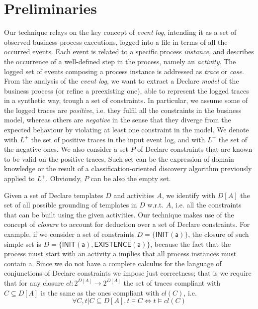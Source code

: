 \section{Preliminaries}
\label{sec:pre}

Our technique relays on the key concept of \emph{event log}, intending it as a set of observed business process executions, logged into a file in terms of all the occurred events. Each event is related to a specific process \emph{instance}, and describes the occurrence of a well-defined step in the process, namely an \emph{activity}. The logged set of events composing a process instance is addressed as \emph{trace} or \emph{case}. 
From the analysis of the \emph{event log}, we want to extract a Declare \cite{?} \emph{model} of the business process (or refine a preexisting one), able to represent the logged traces in a synthetic way, trough a set of constraints.
In particular, we assume some of the logged traces are \emph{positive}, i.e. they fulfil all the constraints in the business model, whereas others are \emph{negative} in the sense that they diverge from the expected behaviour by violating at least one constraint in the model. 
We denote with $L^+$ the set of positive traces in the input event log, and with $L^-$ the set of the negative ones.
We also consider a set $P$ of Declare constraints that are known to be valid on the positive traces. Such set can be the expression of domain knowledge or the result of a classification-oriented discovery algorithm previously applied to $L^+$. Obviously, $P$ can be also the empty set.

Given a set of Declare templates $D$ and activities $A$, we identify with $D[A]$ the set of all possible grounding of templates in $D$ w.r.t. $A$, i.e. all the constraints that can be built using the given activities. 
Our technique makes use of the concept of \emph{closure} to account for deduction over a set of Declare constraints.
%
For example, if we consider a set of constraints $D=\{\mathsf{INIT(a)}\}$, the closure of such simple set is $D=\{\mathsf{INIT(a), EXISTENCE(a)}\}$, because the fact that the process must start with an activity \textsf{a} implies that all process instances must contain \textsf{a}.
%
Since we do not have a complete calculus for the language of conjunctions of Declare constraints we impose just correctness; that is we require that for any closure ${cl}: 2^{D[A]} \rightarrow 2^{D[A]}$ the set of traces compliant with $C \subseteq D[A]$ is the same as the ones compliant with ${cl}(C)$, i.e.
\begin{equation}
\forall C,t  | C \subseteq D[A], t \models C \iff t \models {cl}(C)
\end{equation}


